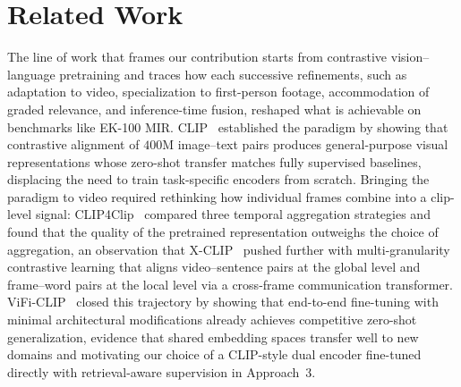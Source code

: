 \section{Related Work}
\label{sec:sota}

The line of work that frames our contribution starts from contrastive vision--language pretraining and traces how each successive refinements, such as adaptation to video, specialization to first-person footage, accommodation of graded relevance, and inference-time fusion, reshaped what is achievable on benchmarks like EK-100 MIR. CLIP~\cite{radford2021clip} established the paradigm by showing that contrastive alignment of $400$M image--text pairs produces general-purpose visual representations whose zero-shot transfer matches fully supervised baselines, displacing the need to train task-specific encoders from scratch. Bringing the paradigm to video required rethinking how individual frames combine into a clip-level signal: CLIP4Clip~\cite{luo2022clip4clip} compared three temporal aggregation strategies and found that the quality of the pretrained representation outweighs the choice of aggregation, an observation that X-CLIP~\cite{ma2022xclip} pushed further with multi-granularity contrastive learning that aligns video--sentence pairs at the global level and frame--word pairs at the local level via a cross-frame communication transformer. ViFi-CLIP~\cite{rasheed2023vificlip} closed this trajectory by showing that end-to-end fine-tuning with minimal architectural modifications already achieves competitive zero-shot generalization, evidence that shared embedding spaces transfer well to new domains and motivating our choice of a CLIP-style dual encoder fine-tuned directly with retrieval-aware supervision in Approach~3.

